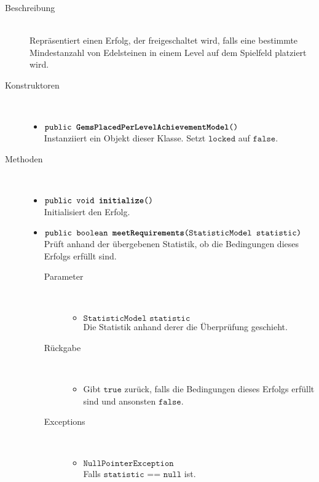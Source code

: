 \begin{description}
\item[Beschreibung] \hfill \\ Repräsentiert einen Erfolg, der freigeschaltet wird, falls eine bestimmte Mindestanzahl von Edelsteinen in einem Level auf dem Spielfeld platziert wird.
	
\item[Konstruktoren] \hfill \\
	\vspace{-.8cm}
	\begin{itemize}
		\item $\texttt{public \textbf{GemsPlacedPerLevelAchievementModel}()}$ \\ Instanziiert ein Objekt dieser Klasse. Setzt $\texttt{locked}$ auf $\texttt{false}$.
	\end{itemize}
	
\item[Methoden] \hfill \\
	\vspace{-.8cm}
	\begin{itemize}
				\item $\texttt{public void \textbf{initialize}()}$ \\ Initialisiert den Erfolg.
		
		\item $\texttt{public boolean \textbf{meetRequirements}(StatisticModel statistic)}$ \\ Prüft anhand der übergebenen Statistik, ob die Bedingungen dieses Erfolgs erfüllt sind.
		\begin{description}
		\item[Parameter] \hfill \\
			\vspace{-.8cm}
			\begin{itemize}
				\item $\texttt{StatisticModel statistic}$ \\ Die Statistik anhand derer die Überprüfung geschieht. 
			\end{itemize}
			\item[Rückgabe] \hfill \\
			\vspace{-.8cm}
			\begin{itemize}
				\item Gibt $\texttt{true}$ zurück, falls die Bedingungen dieses Erfolgs erfüllt sind und ansonsten $\texttt{false}$.
			\end{itemize}
			\item[Exceptions] \hfill \\
			\vspace{-.8cm}
			\begin{itemize}
				\item $\texttt{NullPointerException}$ \\ Falls $\texttt{statistic == null}$ ist.
			\end{itemize}
		\end{description}
	\end{itemize}
\end{description}

